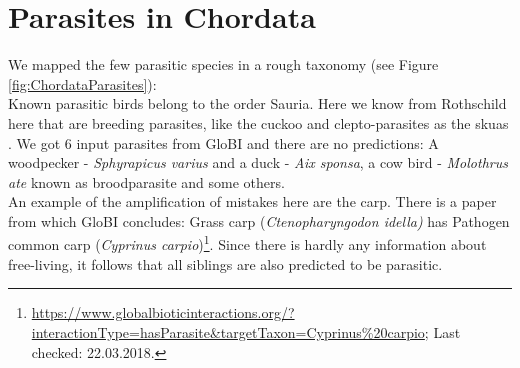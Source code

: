   \section{Parasites in Chordata} \label{sec:parasites in chordata}
    We mapped the few parasitic species in a rough taxonomy (see Figure \ref{fig:ChordataParasites}): \\
    Known parasitic birds belong to the order Sauria. Here we know from Rothschild here that are 
      breeding parasites, like the cuckoo and clepto-parasites as the skuas \cite{Rothschild1957}. We
      got 6 input parasites from GloBI and there are no predictions: A woodpecker - 
      \textit{Sphyrapicus varius} and a duck - \textit{Aix sponsa}, a cow bird - \textit{Molothrus ate} 
      known as broodparasite and some others. \\
    An example of the amplification of mistakes here are the carp. There is a paper from which GloBI 
      concludes: Grass carp (\textit{Ctenopharyngodon idella)} has Pathogen common carp 
      (\textit{Cyprinus carpio})\footnote{
        \hyperlink{https://www.globalbioticinteractions.org/?interactionType=hasParasite&targetTaxon=Cyprinus\%20carpio}
        {https://www.globalbioticinteractions.org/?interactionType=hasParasite\&targetTaxon=Cyprinus\%20carpio};
        Last checked: 22.03.2018.
      }. Since there is hardly any information about free-living, it follows that all siblings are 
      also predicted to be parasitic.

